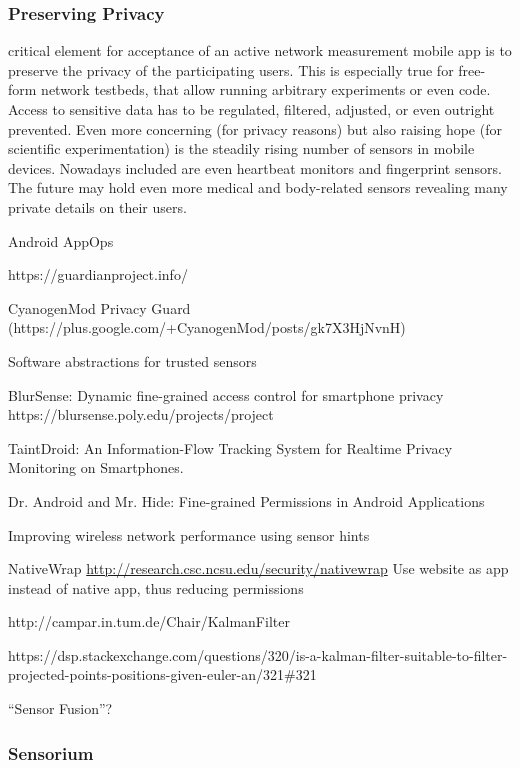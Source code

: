 \subsubsection{Preserving Privacy}



critical element for acceptance of an active network measurement mobile app is to preserve the privacy of the participating users. This is especially true for free-form network testbeds, that allow running arbitrary experiments or even code. Access to sensitive data has to be regulated, filtered, adjusted, or even outright prevented. Even more concerning (for privacy reasons) but also raising hope (for scientific experimentation) is the steadily rising number of sensors in mobile devices. Nowadays included are even heartbeat monitors and fingerprint sensors. The future may hold even more medical and body-related sensors revealing many private details on their users.

Android AppOps

https://guardianproject.info/

CyanogenMod Privacy Guard (https://plus.google.com/+CyanogenMod/posts/gk7X3HjNvnH)

Software abstractions for trusted sensors \cite{Liu:2012:SAT:2307636.2307670}

BlurSense: Dynamic fine-grained access control for smartphone privacy~\cite{6798970}
https://blursense.poly.edu/projects/project

TaintDroid: An Information-Flow Tracking System for Realtime Privacy Monitoring on Smartphones. \cite{enck2010taintdroid}

Dr. Android and Mr. Hide: Fine-grained Permissions in Android Applications \cite{Jeon:2012:DAM:2381934.2381938}

Improving wireless network performance using sensor hints \cite{ravindranath2011improving}

NativeWrap \url{http://research.csc.ncsu.edu/security/nativewrap} \cite{Nadkarni:2014:NAH:2627393.2627412}
Use website as app instead of native app, thus reducing permissions

http://campar.in.tum.de/Chair/KalmanFilter

https://dsp.stackexchange.com/questions/320/is-a-kalman-filter-suitable-to-filter-projected-points-positions-given-euler-an/321\#321

``Sensor Fusion''?

\subsubsection{Sensorium}


